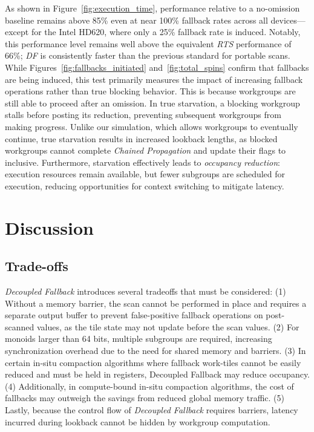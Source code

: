 \documentclass[acmsmall, manuscript, screen, review, anonymous]{acmart}
\begin{document}
As shown in Figure~\ref{fig:execution_time}, performance relative to a no-omission baseline remains above 85\% even at near 100\% fallback rates across all devices---except for the Intel HD620, where only a 25\% fallback rate is induced. Notably, this performance level remains well above the equivalent \emph{RTS} performance of 66\%; \emph{DF} is consistently faster than the previous standard for portable scans. While Figures~\ref{fig:fallbacks_initiated} and~\ref{fig:total_spins} confirm that fallbacks are being induced, this test primarily measures the impact of increasing fallback operations rather than true blocking behavior. This is because workgroups are still able to proceed after an omission. In true starvation, a blocking workgroup stalls before posting its reduction, preventing subsequent workgroups from making progress. Unlike our simulation, which allows workgroups to eventually continue, true starvation results in increased lookback lengths, as blocked workgroups cannot complete \emph{Chained Propagation} and update their flags to inclusive. Furthermore, starvation effectively leads to \emph{occupancy reduction}: execution resources remain available, but fewer subgroups are scheduled for execution, reducing opportunities for context switching to mitigate latency.
\section{Discussion}

\subsection{Trade-offs}
\emph{Decoupled Fallback} introduces several tradeoffs that must be considered: (1) Without a memory barrier, the scan cannot be performed in place and requires a separate output buffer to prevent false-positive fallback operations on post-scanned values, as the tile state may not update before the scan values. (2) For monoids larger than 64 bits, multiple subgroups are required, increasing synchronization overhead due to the need for shared memory and barriers. (3) In certain in-situ compaction algorithms where fallback work-tiles cannot be easily reduced and must be held in registers, Decoupled Fallback may reduce occupancy. (4) Additionally, in compute-bound in-situ compaction algorithms, the cost of fallbacks may outweigh the savings from reduced global memory traffic. (5) Lastly, because the control flow of \emph{Decoupled Fallback} requires barriers, latency incurred during lookback cannot be hidden by workgroup computation.
\end{document}
